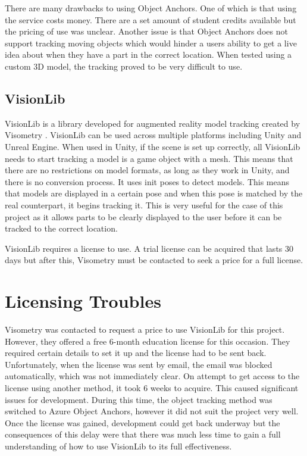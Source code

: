\documentclass{l4proj}
\begin{document}
There are many drawbacks to using Object Anchors. One of which is that using the service costs money. There are a set amount of student credits available but the pricing of use was unclear. Another issue is that Object Anchors does not support tracking moving objects which would hinder a users ability to get a live idea about when they have a part in the correct location. When tested using a custom 3D model, the tracking proved to be very difficult to use.

\subsection{VisionLib}

VisionLib is a library developed for augmented reality model tracking created by Visometry \citep{visometry_visionlib_nodate}. VisionLib can be used across multiple platforms including Unity and Unreal Engine. When used in Unity, if the scene is set up correctly, all VisionLib needs to start tracking a model is a game object with a mesh. This means that there are no restrictions on model formats, as long as they work in Unity, and there is no conversion process. It uses init poses to detect models. This means that models are displayed in a certain pose and when this pose is matched by the real counterpart, it begins tracking it. This is very useful for the case of this project as it allows parts to be clearly displayed to the user before it can be tracked to the correct location. %

VisionLib requires a license to use. A trial license can be acquired that lasts 30 days but after this, Visometry must be contacted to seek a price for a full license.

\section{Licensing Troubles}
\label{sec:license}

Visometry was contacted to request a price to use VisionLib for this project. However, they offered a free 6-month education license for this occasion. They required certain details to set it up and the license had to be sent back. Unfortunately, when the license was sent by email, the email was blocked automatically, which was not immediately clear. On attempt to get access to the license using another method, it took 6 weeks to acquire. This caused significant issues for development. During this time, the object tracking method was switched to Azure Object Anchors, however it did not suit the project very well. Once the license was gained, development could get back underway but the consequences of this delay were that there was much less time to gain a full understanding of how to use VisionLib to its full effectiveness.
\end{document}
